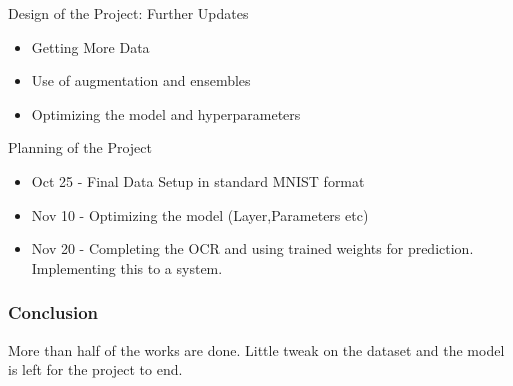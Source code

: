 \documentclass{beamer}
\begin{document}
\begin{frame}{Design of the Project: Further Updates}
     \begin{itemize}
        \item Getting More Data 
        
        \item Use of augmentation and ensembles

        \item Optimizing the model and hyperparameters


    \end{itemize}
\end{frame}

\begin{frame}{Planning of the Project}
\begin{itemize}
    \item Oct 25 - Final Data Setup in standard MNIST format
    \item Nov 10 - Optimizing the model (Layer,Parameters etc)
    \item Nov 20 - Completing the OCR and using trained weights for prediction. Implementing this to a system. 
\end{itemize}
\end{frame}

\begin{frame}
\frametitle{Conclusion}
More than half of the works are done. Little tweak on the dataset and the model is left for the project to end.
\end{frame}
\end{document}
